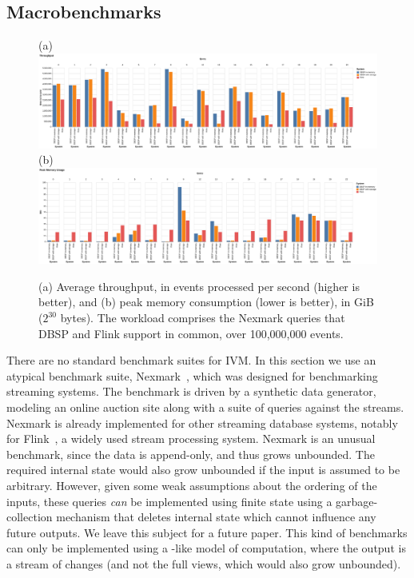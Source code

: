 \subsection{Macrobenchmarks}\label{sec:macrobenchmarks}

\begin{figure}
  (a) \includegraphics[width=.95\textwidth]{graph/throughput} \\
  (b) \includegraphics[width=.95\textwidth]{graph/memory} \\
  \caption{(a) Average throughput, in events processed per second
    (higher is better), and (b) peak memory consumption (lower is
    better), in GiB (\(2^{30}\) bytes).  The workload comprises the
    Nexmark queries that DBSP and Flink support in common, over
    100,000,000 events.\label{fig:macrobenchmark}}
\end{figure}

There are no standard benchmark suites for IVM.  In this section we
use an atypical benchmark suite, Nexmark~\cite{tucker2008nexmark},
which was designed for benchmarking streaming systems.  The benchmark
is driven by a synthetic data generator, modeling an online
auction site along with a suite of queries against the streams.
Nexmark is already implemented for other streaming database systems,
notably for Flink~\cite{carbone-ieee15,nexmark-flink}, a widely used
stream processing system.  Nexmark is an unusual benchmark, since the
data is append-only, and thus grows unbounded.  The required internal
state would also grow unbounded if the input is assumed to be
arbitrary.  However, given some weak assumptions about the ordering of
the inputs, these queries \emph{can} be implemented using finite state
using a garbage-collection mechanism that deletes internal state which
cannot influence any future outputs.  We leave this subject for a
future paper.  This kind of benchmarks can only be implemented using a
\dbsp-like model of computation, where the output is a stream of
changes (and not the full views, which would also grow unbounded).

